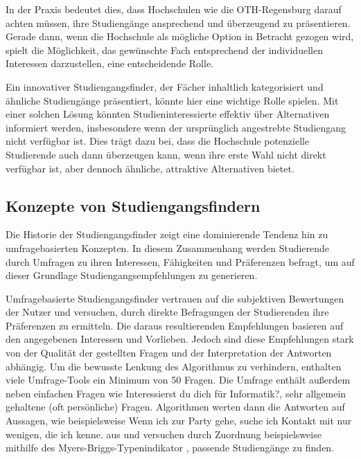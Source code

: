 In der Praxis bedeutet dies, dass Hochschulen wie die OTH-Regensburg darauf
achten müssen, ihre Studiengänge ansprechend und überzeugend zu präsentieren.
Gerade dann, wenn die Hochschule als mögliche Option in Betracht gezogen wird,
spielt die Möglichkeit, das gewünschte Fach entsprechend der individuellen
Interessen darzustellen, eine entscheidende Rolle.

Ein innovativer Studiengangsfinder, der Fächer inhaltlich kategorisiert und
ähnliche Studiengänge präsentiert, könnte hier eine wichtige Rolle spielen. Mit
einer solchen Lösung könnten Studieninteressierte effektiv über Alternativen
informiert werden, insbesondere wenn der ursprünglich angestrebte Studiengang
nicht verfügbar ist. Dies trägt dazu bei, dass die Hochschule potenzielle
Studierende auch dann überzeugen kann, wenn ihre erste Wahl nicht direkt
verfügbar ist, aber dennoch ähnliche, attraktive Alternativen bietet.


\subsection{Konzepte von Studiengangsfindern}\label{sec:konzepte-von-studiengangsfindern}
Die Historie der Studiengangsfinder zeigt eine dominierende Tendenz hin zu
umfragebasierten Konzepten. In diesem Zusammenhang werden Studierende durch
Umfragen zu ihren Interessen, Fähigkeiten und Präferenzen befragt, um auf dieser
Grundlage Studiengangsempfehlungen zu generieren.

Umfragebasierte Studiengangsfinder vertrauen auf die subjektiven Bewertungen
der Nutzer und versuchen, durch direkte Befragungen der Studierenden ihre
Präferenzen zu ermitteln. Die daraus resultierenden Empfehlungen basieren auf
den angegebenen Interessen und Vorlieben. Jedoch sind diese Empfehlungen stark
von der Qualität der gestellten Fragen und der Interpretation der Antworten
abhängig. Um die bewusste Lenkung des Algorithmus zu verhindern, enthalten viele
Umfrage-Tools ein Minimum von 50 Fragen. Die Umfrage enthält außerdem neben
einfachen Fragen wie \glqq Interessierst du dich für Informatik?\grqq{}, sehr
allgemein gehaltene (oft persönliche) Fragen. Algorithmen werten dann die
Antworten auf Aussagen, wie beispielsweise \glqq Wenn ich zur Party
gehe, suche ich Kontakt mit nur wenigen, die ich kenne.\grqq{} aus und versuchen
durch Zuordnung beispielsweise mithilfe des Myers-Briggs-Typenindikator
\parencite{company_mbti_2023}, passende Studiengänge zu finden. \parencite{uniturmde_studiumsfinder_2023}

